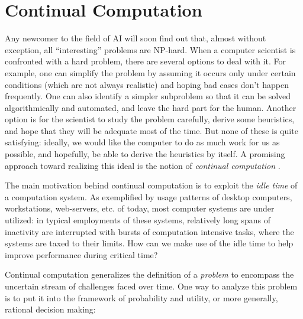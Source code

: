\documentclass[]{llncs}
\begin{document}
\section{Continual Computation\label{continual}}

Any newcomer to the field of AI will soon find out that, almost without
exception, all {}``interesting'' problems are NP-hard.  When a computer
scientist is confronted with a hard problem, there are several options to
deal with it.  For example, one can simplify the problem by assuming it
occurs only under certain conditions (which are not always realistic) and
hoping bad cases don't happen frequently.  One can also identify a simpler
subproblem so that it can be solved algorithmically and automated, and
leave the hard part for the human.  Another option is for the scientist to
study the problem carefully, derive some heuristics, and hope that they
will be adequate most of the time.  But none of these is quite satisfying:
ideally, we would like the computer to do as much work for us as possible,
and hopefully, be able to derive the heuristics by itself.  A promising
approach toward realizing this ideal is the notion of \emph{continual
  computation} \cite{horvitz1997:models_continual}.

The main motivation behind continual computation is to exploit the
\emph{idle time} of a computation system.  As exemplified by usage patterns
of desktop computers, workstations, web-servers, etc. of today, most
computer systems are under utilized: in typical employments of these
systems, relatively long spans of inactivity are interrupted with bursts of
computation intensive tasks, where the systems are taxed to their limits.
How can we make use of the idle time to help improve performance during
critical time?

Continual computation generalizes the definition of a \emph{problem} to
encompass the uncertain stream of challenges faced over time.  One way to
analyze this problem is to put it into the framework of probability and
utility, or more generally, rational decision making:
\end{document}
